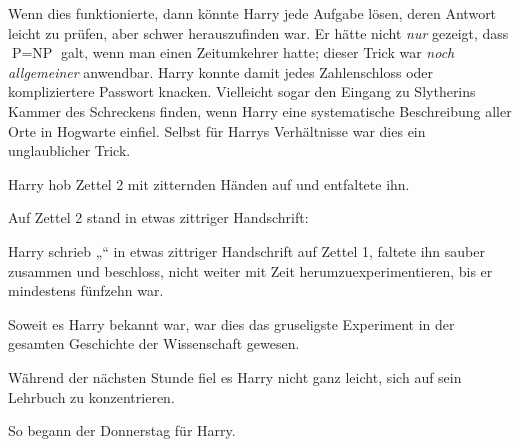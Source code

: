 Wenn dies funktionierte, dann könnte Harry jede Aufgabe lösen, deren Antwort leicht zu prüfen, aber schwer herauszufinden war. Er hätte nicht \emph{nur} gezeigt, dass $\mbox{P}=\mbox{NP}$ galt, wenn man einen Zeitumkehrer hatte; dieser Trick war \emph{noch allgemeiner} anwendbar. Harry konnte damit jedes Zahlenschloss oder kompliziertere Passwort knacken. Vielleicht sogar den Eingang zu Slytherins Kammer des Schreckens finden, wenn Harry eine systematische Beschreibung aller Orte in Hogwarte einfiel. Selbst für Harrys Verhältnisse war dies ein unglaublicher Trick.

Harry hob Zettel 2 mit zitternden Händen auf und entfaltete ihn.

Auf Zettel 2 stand in etwas zittriger Handschrift:


Harry schrieb „“ in etwas zittriger Handschrift auf Zettel 1, faltete ihn sauber zusammen und beschloss, nicht weiter mit Zeit herumzuexperimentieren, bis er mindestens fünfzehn war.

Soweit es Harry bekannt war, war dies das gruseligste Experiment in der gesamten Geschichte der Wissenschaft gewesen.

Während der nächsten Stunde fiel es Harry nicht ganz leicht, sich auf sein Lehrbuch zu konzentrieren.

So begann der Donnerstag für Harry.


